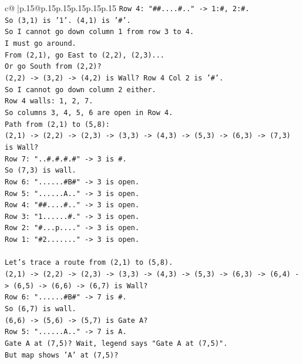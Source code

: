 \documentclass{article}
\begin{document}
{\begin{supertabular}{c@{$\;$}|p{.15\linewidth}@{}p{.15\linewidth}p{.15\linewidth}p{.15\linewidth}p{.15\linewidth}p{.15\linewidth}}
{{{\texttt{Row 4: "\#\#....\#.." {-}> 1:\#, 2:\#.} \\
\texttt{So (3,1) is '1'. (4,1) is '\#'.} \\
\texttt{So I cannot go down column 1 from row 3 to 4.} \\
\texttt{I must go around.} \\
\texttt{From (2,1), go East to (2,2), (2,3)...} \\
\texttt{Or go South from (2,2)?} \\
\texttt{(2,2) {-}> (3,2) {-}> (4,2) is Wall? Row 4 Col 2 is '\#'.} \\
\texttt{So I cannot go down column 2 either.} \\
\texttt{Row 4 walls: 1, 2, 7.} \\
\texttt{So columns 3, 4, 5, 6 are open in Row 4.} \\
\texttt{Path from (2,1) to (5,8):} \\
\texttt{(2,1) {-}> (2,2) {-}> (2,3) {-}> (3,3) {-}> (4,3) {-}> (5,3) {-}> (6,3) {-}> (7,3) is Wall?} \\
\texttt{Row 7: "..\#.\#.\#.\#" {-}> 3 is \#.} \\
\texttt{So (7,3) is wall.} \\
\texttt{Row 6: "......\#B\#" {-}> 3 is open.} \\
\texttt{Row 5: "......A.." {-}> 3 is open.} \\
\texttt{Row 4: "\#\#....\#.." {-}> 3 is open.} \\
\texttt{Row 3: "1......\#." {-}> 3 is open.} \\
\texttt{Row 2: "\#...p...." {-}> 3 is open.} \\
\texttt{Row 1: "\#2......." {-}> 3 is open.} \\
\\ 
\texttt{Let's trace a route from (2,1) to (5,8).} \\
\texttt{(2,1) {-}> (2,2) {-}> (2,3) {-}> (3,3) {-}> (4,3) {-}> (5,3) {-}> (6,3) {-}> (6,4) {-}> (6,5) {-}> (6,6) {-}> (6,7) is Wall?} \\
\texttt{Row 6: "......\#B\#" {-}> 7 is \#.} \\
\texttt{So (6,7) is wall.} \\
\texttt{(6,6) {-}> (5,6) {-}> (5,7) is Gate A?} \\
\texttt{Row 5: "......A.." {-}> 7 is A.} \\
\texttt{Gate A at (7,5)? Wait, legend says "Gate A at (7,5)".} \\
\texttt{But map shows 'A' at (7,5)?} \\
}}}
\end{supertabular}}
\end{document}
